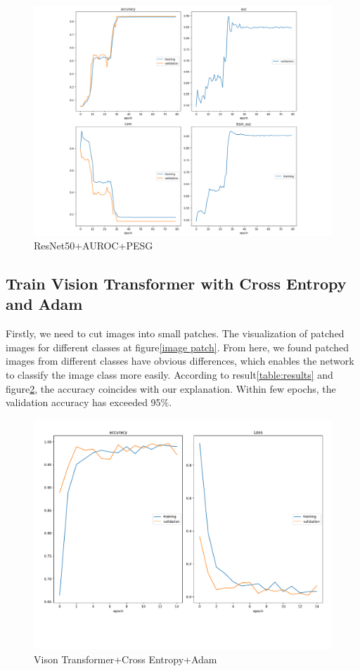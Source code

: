\documentclass[10pt,twocolumn,letterpaper]{article}
\begin{document}
\begin{figure}[ht]
    \centering
    \includegraphics[scale = 0.33]{ProgressReport/AUC.pdf}
    \caption{ResNet50+AUROC+PESG}
    \label{AUC}
\end{figure}


\subsection{Train Vision Transformer with Cross Entropy and Adam} 
Firstly, we need to cut images into small patches. The visualization of patched images for different classes at figure\ref{image patch}. From here, we found patched images from different classes have obvious differences, which enables the network to classify the image class more easily.
According to result\ref{table:results} and figure\ref{Vision Trans}, the accuracy coincides with our explanation.  Within few epochs, the validation accuracy has exceeded 95$\%$.
\begin{figure}[ht]
    \centering
    \includegraphics[scale = 0.3]{ProgressReport/ViT_2.pdf}
    \caption{Vison Transformer+Cross Entropy+Adam}
    \label{Vision Trans}
    
\end{figure}
\end{document}
